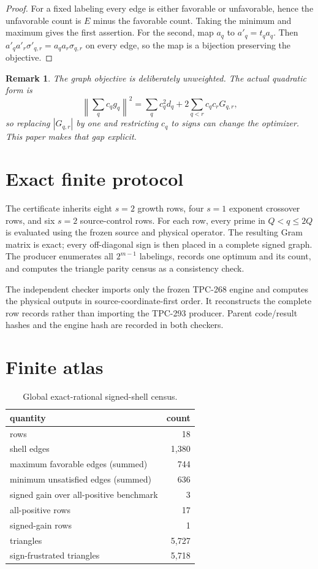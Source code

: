 \documentclass[10pt]{article}
\newtheorem{remark}{Remark}
\newcommand{\norm}[1]{\left\lVert #1\right\rVert}
\begin{document}
\begin{proof}
For a fixed labeling every edge is either favorable or unfavorable, hence the
unfavorable count is $E$ minus the favorable count.  Taking the minimum and
maximum gives the first assertion.  For the second, map $a_q$ to
$a'_q=t_qa_q$.  Then
$a'_qa'_r\sigma'_{q,r}=a_qa_r\sigma_{q,r}$ on every edge, so the map is a
bijection preserving the objective.
\end{proof}

\begin{remark}
The graph objective is deliberately unweighted.  The actual quadratic form
is
\[
 \norm{\sum_q c_qg_q}^2=\sum_qc_q^2d_q+
 2\sum_{q<r}c_qc_rG_{q,r},
\]
so replacing $|G_{q,r}|$ by one and restricting $c_q$ to signs can change the
optimizer.  This paper makes that gap explicit.
\end{remark}

\section{Exact finite protocol}

The certificate inherits eight $s=2$ growth rows, four $s=1$ exponent
crossover rows, and six $s=2$ source-control rows.  For each row, every
prime in $Q<q\leq2Q$ is evaluated using the frozen source and physical
operator.  The resulting Gram matrix is exact; every off-diagonal sign is
then placed in a complete signed graph.  The producer enumerates all
$2^{m-1}$ labelings, records one optimum and its count, and computes the
triangle parity census as a consistency check.

The independent checker imports only the frozen TPC-268 engine and computes
the physical outputs in source-coordinate-first order.  It reconstructs the
complete row records rather than importing the TPC-293 producer.  Parent
code/result hashes and the engine hash are recorded in both checkers.

\section{Finite atlas}

\begin{table}[ht]
\centering
\small
\caption{Global exact-rational signed-shell census.}
\label{tab:global}
\begin{tabular}{@{}lr@{}}
\toprule
quantity & count\\
\midrule
rows & 18\\
shell edges & 1,380\\
maximum favorable edges (summed) & 744\\
minimum unsatisfied edges (summed) & 636\\
signed gain over all-positive benchmark & 3\\
all-positive rows & 17\\
signed-gain rows & 1\\
triangles & 5,727\\
sign-frustrated triangles & 5,718\\
\bottomrule
\end{tabular}
\end{table}
\end{document}
